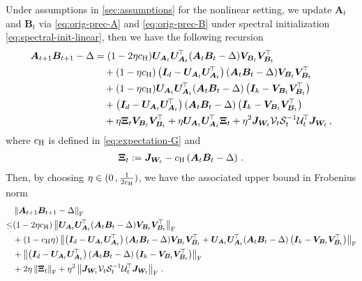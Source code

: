 \begin{lemma}\label{Lip}
    Under assumptions in \cref{sec:assumptions} for the nonlinear setting, we update $\bm A_t$ and $\bm B_t$ via \cref{eq:orig-prec-A} and \cref{eq:orig-prec-B} under spectral initialization \eqref{eq:spectral-init-linear}, then we have the following recursion
    \begin{align}\label{recursion}
    \bm A_{t+1}\bm B_{t+1} - \Delta & = (1-2 \eta c_{\rm H})\bm U_{\bm A_t} \bm U_{\bm A_t}^{\!\top}(\bm A_t \bm B_t - \Delta)\bm V_{\bm B_t} \bm V_{\bm B_t}^{\!\top}\nonumber\\
    & \quad + (1-\eta c_{\rm H})\left(\bm I_d - \bm U_{\bm A_t} \bm U_{\bm A_t}^{\!\top}\right)(\bm A_t \bm B_t - \Delta)\bm V_{\bm B_t} \bm V_{\bm B_t}^{\!\top}\nonumber\\
    & \quad + (1-\eta c_{\rm H})\bm U_{\bm A_t} \bm U_{\bm A_t}^{\!\top}(\bm A_t \bm B_t - \Delta)\left(\bm I_k - \bm V_{\bm B_t} \bm V_{\bm B_t}^{\!\top}\right)\nonumber\\
    & \quad + \left(\bm I_d - \bm U_{\bm A_t} \bm U_{\bm A_t}^{\!\top}\right)(\bm A_t \bm B_t - \Delta)\left(\bm I_k - \bm V_{\bm B_t} \bm V_{\bm B_t}^{\!\top}\right)\nonumber\\
    & \quad + \eta \bm \Xi_t \bm V_{\bm B_t} \bm V_{\bm B_t}^{\!\top} + \eta \bm U_{\bm A_t} \bm U_{\bm A_t}^{\!\top} \bm \Xi_t + \eta^2 \bm J_{\bm W_t} \mathcal{V}_t \mathcal{S}_t^{-1} \mathcal{U}^{\!\top}_t\bm J_{\bm W_t}\,,
    \end{align}
    where $c_{\rm H}$ is defined in \cref{eq:expectation-G} and
    \begin{align*}
    \bm \Xi_t := \bm J_{\bm W_t} - c_{\rm H}\left(\bm A_t \bm B_t - \Delta\right)\,.
    \end{align*}
    Then, by choosing $\eta\in (0\,,\frac{1}{2c_{\rm H}})$, we have the associated upper bound in Frobenius norm
    \begin{align}\label{lip-upper}
        & \left\|\bm A_{t+1}\bm B_{t+1} - \Delta\right\|_{\rm F}\\
        \leq & (1-2\eta c_{\rm H})\left\|\bm U_{\bm A_t} \bm U_{\bm A_t}^{\!\top}(\bm A_t \bm B_t - \Delta)\bm V_{\bm B_t} \bm V_{\bm B_t}^{\!\top}\right\|_{\rm F}\nonumber\\
        & + (1-c_{\rm H}\eta) \left\|\left(\bm I_d - \bm U_{\bm A_t} \bm U_{\bm A_t}^{\!\top}\right)(\bm A_t \bm B_t - \Delta)\bm V_{\bm B_t} \bm V_{\bm B_t}^{\!\top}+\bm U_{\bm A_t} \bm U_{\bm A_t}^{\!\top}(\bm A_t \bm B_t - \Delta)\left(\bm I_k - \bm V_{\bm B_t} \bm V_{\bm B_t}^{\!\top}\right)\right\|_{\rm F}\nonumber\\
        & + \left\|\left(\bm I_d - \bm U_{\bm A_t} \bm U_{\bm A_t}^{\!\top}\right)(\bm A_t \bm B_t - \Delta)\left(\bm I_k - \bm V_{\bm B_t} \bm V_{\bm B_t}^{\!\top}\right)\right\|_{\rm F}\nonumber\\
        & + 2\eta\left\|\bm \Xi_t\right\|_{\rm F}+\eta^2\left\|\bm J_{\bm W_t} \mathcal{V}_t \mathcal{S}_t^{-1} \mathcal{U}^{\!\top}_t\bm J_{\bm W_t}\right\|_{\rm F}\,.
    \end{align}
\end{lemma}
